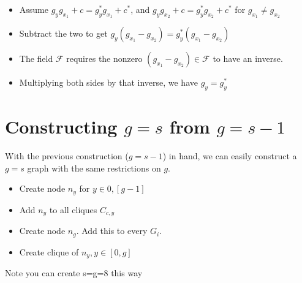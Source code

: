 \documentclass[11pt, oneside]{article} 	%
\begin{document}
\begin{itemize}
\item Assume $g_yg_{x_1} + c = g_y^*g_{x_1} +c^*$, and $g_yg_{x_2} + c = g_y^*g_{x_2} +c^*$ for $g_{x_1} \neq g_{x_2}$
\item Subtract the two to get $g_y(g_{x_1} - g_{x_2}) = g_y^*(g_{x_1} - g_{x_2})$
\item The field $\mathcal{F}$ requires the nonzero $(g_{x_1} - g_{x_2}) \in \mathcal{F}$ to have an inverse. 
\item Multiplying both sides by that inverse, we have $g_y = g_y^*$
\end{itemize}


\section{Constructing $g=s$ from $g=s-1$}

With the previous construction ($g=s-1$) in hand, we can easily construct a $g=s$ graph with the same restrictions on $g$.
\begin{itemize}
\item Create node $n_y$ for $y \in 0, [g-1]$
\item Add $n_y$ to all cliques $C_{c, y}$
\item Create node $n_g$.  Add this to every $G_i$.
\item Create clique of $n_y, y \in [0, g]$
\end{itemize}



Note you can create s=g=8 this way 
\end{document}
